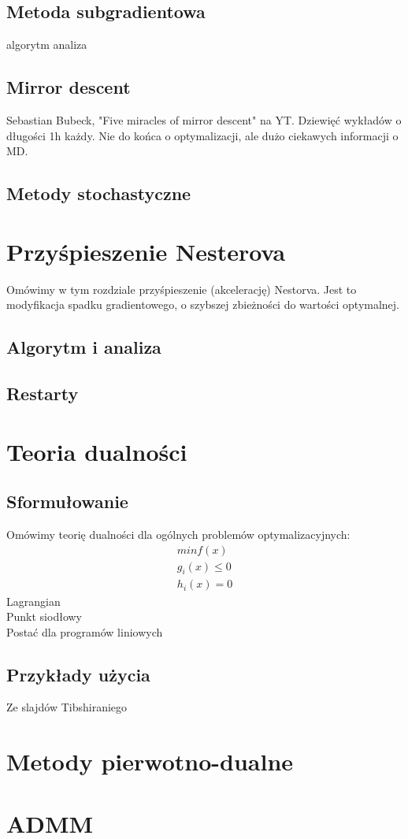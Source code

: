 \documentclass[10pt,a4paper,draft]{report}
\begin{document}
\section{Metoda subgradientowa}
algorytm
analiza

\section{Mirror descent}

Sebastian Bubeck, "Five miracles of mirror descent" na YT. Dziewięć wykładów o długości 1h każdy. Nie do końca o optymalizacji, ale dużo ciekawych informacji o MD.

\section{Metody stochastyczne}

\chapter{Przyśpieszenie Nesterova}
Omówimy w tym rozdziale przyśpieszenie (akcelerację) Nestorva. Jest to modyfikacja spadku gradientowego, o szybszej zbieżności do wartości optymalnej.
\section{Algorytm i analiza}

\section{Restarty}


\chapter{Teoria dualności}
\section{Sformułowanie}
Omówimy teorię dualności dla ogólnych problemów optymalizacyjnych:
\[
\begin{array}{c}
min f(x) \\
g_i(x) \leq 0 \\
h_i(x) = 0
\end{array}
\]
Lagrangian \\
Punkt siodłowy \\
Postać dla programów liniowych
\section{Przykłady użycia}
Ze slajdów Tibshiraniego

\chapter{Metody pierwotno-dualne}

\chapter{ADMM}
\end{document}

